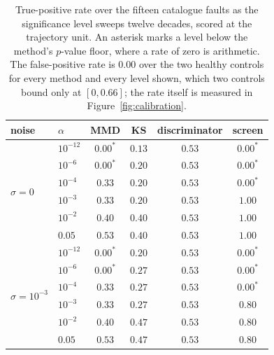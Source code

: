\documentclass{article}
\begin{document}
\begin{table}[t]
\caption{True-positive rate over the fifteen catalogue faults as the
significance level sweeps twelve decades, scored at the trajectory unit. An
asterisk marks a level below the method's $p$-value floor, where a rate of
zero is arithmetic. The false-positive rate is $0.00$ over the two healthy
controls for every method and every level shown, which two controls bound only
at $[0, 0.66]$; the rate itself is measured in
Figure~\ref{fig:calibration}.}
\label{tab:roc}
\begin{center}
\small
\begin{tabular}{llcccc}
noise & $\alpha$ & MMD & KS & discriminator & \textbf{screen} \\
\hline
\multirow{6}{*}{$\sigma = 0$}
 & $10^{-12}$ & $0.00^{*}$ & $0.13$ & $0.53$ & $0.00^{*}$ \\
 & $10^{-6}$  & $0.00^{*}$ & $0.20$ & $0.53$ & $0.00^{*}$ \\
 & $10^{-4}$  & $0.33$ & $0.20$ & $0.53$ & $0.00^{*}$ \\
 & $10^{-3}$  & $0.33$ & $0.20$ & $0.53$ & $\mathbf{1.00}$ \\
 & $10^{-2}$  & $0.40$ & $0.40$ & $0.53$ & $\mathbf{1.00}$ \\
 & $0.05$     & $0.53$ & $0.40$ & $0.53$ & $\mathbf{1.00}$ \\
\hline
\multirow{6}{*}{$\sigma = 10^{-3}$}
 & $10^{-12}$ & $0.00^{*}$ & $0.20$ & $0.53$ & $0.00^{*}$ \\
 & $10^{-6}$  & $0.00^{*}$ & $0.27$ & $0.53$ & $0.00^{*}$ \\
 & $10^{-4}$  & $0.33$ & $0.27$ & $0.53$ & $0.00^{*}$ \\
 & $10^{-3}$  & $0.33$ & $0.27$ & $0.53$ & $\mathbf{0.80}$ \\
 & $10^{-2}$  & $0.40$ & $0.47$ & $0.53$ & $\mathbf{0.80}$ \\
 & $0.05$     & $0.53$ & $0.47$ & $0.53$ & $\mathbf{0.80}$ \\
\end{tabular}
\end{center}
\end{table}
\end{document}
